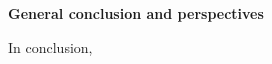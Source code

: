 \chapter*{}
\fancyhf{}
\renewcommand{\headrulewidth}{0pt}
\renewcommand{\footrulewidth}{0pt}

\begin{center}
    \textbf{\huge{General conclusion and perspectives}}
\end{center}
\vspace{1cm}
\normalsize

In conclusion, 

\clearpage